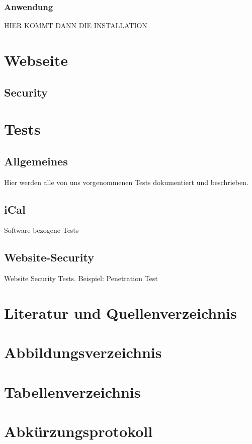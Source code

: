 \documentclass[12pt]{scrartcl}
\begin{document}
\subsubsection {Anwendung}
HIER KOMMT DANN DIE INSTALLATION

\section{Webseite}
\label{sec:Webseite}
\subsection{Security}
\label{sec:Security}

\section{Tests}
\label{sec:Tests}
\subsection{Allgemeines}
Hier werden alle von uns vorgenommenen Tests dokumentiert und beschrieben.

\subsection{iCal}
Software bezogene Tests

\subsection{Website-Security}
Website Security Tests. Beispiel: Penetration Test

\section{Literatur und Quellenverzeichnis}
\label{sec:literatur-quellenverzeichnis}

\section{Abbildungsverzeichnis}
\label{sec:abbildungsverzeichnis}

\section{Tabellenverzeichnis}
\label{sec:tabellenverzeichnis}

\section{Abkürzungsprotokoll}
\label{sec:abkuerzungsprotokoll}
\end{document}
